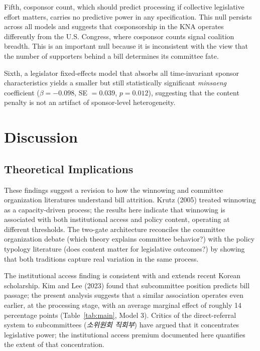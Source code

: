 \documentclass[11pt]{article}
\begin{document}
Fifth, cosponsor count, which should predict processing if collective legislative effort matters, carries no predictive power in any specification. This null persists across all models and suggests that cosponsorship in the KNA operates differently from the U.S. Congress, where cosponsor counts signal coalition breadth. This is an important null because it is inconsistent with the view that the number of supporters behind a bill determines its committee fate.

Sixth, a legislator fixed-effects model that absorbs all time-invariant sponsor characteristics yields a smaller but still statistically significant \emph{minsaeng} coefficient ($\beta = -0.098$, SE $= 0.039$, $p = 0.012$), suggesting that the content penalty is not an artifact of sponsor-level heterogeneity.


\section{Discussion}\label{sec:discussion}

\subsection{Theoretical Implications}\label{sec:implications}

These findings suggest a revision to how the winnowing and committee organization literatures understand bill attrition. Krutz (2005) treated winnowing as a capacity-driven process; the results here indicate that winnowing is associated with both institutional access and policy content, operating at different thresholds. The two-gate architecture reconciles the committee organization debate (which theory explains committee behavior?) with the policy typology literature (does content matter for legislative outcomes?) by showing that both traditions capture real variation in the same process.

The institutional access finding is consistent with and extends recent Korean scholarship. Kim and Lee (2023) found that subcommittee position predicts bill passage; the present analysis suggests that a similar association operates even earlier, at the processing stage, with an average marginal effect of roughly 14 percentage points (Table~\ref{tab:main}, Model 3). Critics of the direct-referral system to subcommittees (\emph{소위원회 직회부}) have argued that it concentrates legislative power; the institutional access premium documented here quantifies the extent of that concentration.
\end{document}
